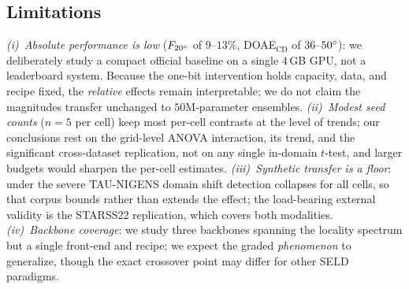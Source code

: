 \subsection{Limitations}
\label{sec:limitations}
\emph{(i)~Absolute performance is low} ($F_{20^\circ}$ of $9$--$13\%$,
DOAE$_\mathrm{CD}$ of $36$--$50^\circ$): we deliberately study a compact official
baseline on a single $4$\,GB GPU, not a leaderboard system. Because the one-bit
intervention holds capacity, data, and recipe fixed, the \emph{relative} effects
remain interpretable; we do not claim the magnitudes transfer unchanged to
$50$M-parameter ensembles.
\emph{(ii)~Modest seed counts} ($n=5$ per cell) keep most per-cell
contrasts at the level of trends; our conclusions rest on the grid-level ANOVA
interaction, its trend, and the significant cross-dataset replication, not on any
single in-domain $t$-test, and larger budgets would sharpen the per-cell estimates.
\emph{(iii)~Synthetic transfer is a floor}: under the severe TAU-NIGENS domain
shift detection collapses for all cells, so that corpus bounds rather than
extends the effect; the load-bearing external validity is the STARSS22
replication, which covers both modalities.
\emph{(iv)~Backbone coverage}: we study three backbones spanning the
locality spectrum but a single front-end and recipe; we expect
the graded \emph{phenomenon} to generalize, though the exact crossover point may
differ for other SELD paradigms.
